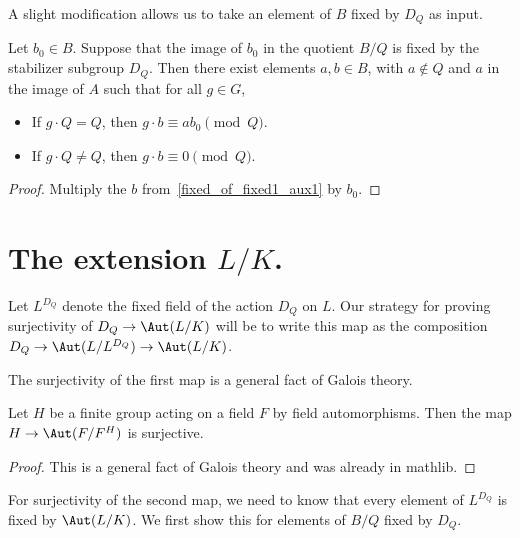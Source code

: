 A slight modification allows us to take an element of $B$ fixed by $D_Q$ as input.

\begin{lemma}
  \label{fixed_of_fixed1_aux2}
  \mathlibok
  Let $b_0 \in B$.
  Suppose that the image of $b_0$ in the quotient $B/Q$ is fixed by the stabilizer subgroup
  $D_Q$.
  Then there exist elements $a,b \in B$, with $a\notin Q$ and $a$ in the image of $A$ such that
  for all $g\in G$,
  \begin{itemize}
    \item If $g \cdot Q = Q$, then $g \cdot b \equiv ab_0 \pmod{Q}$.
    \item If $g \cdot Q \neq Q$, then $g \cdot b \equiv 0 \pmod{Q}$.
  \end{itemize}
\end{lemma}
\begin{proof}
  Multiply the $b$ from~\ref{fixed_of_fixed1_aux1} by $b_0$.
  \mathlibok
\end{proof}

\section{The extension \texorpdfstring{$L/K$}{L/K}.}

Let $L^{D_Q}$ denote the fixed field of the action $D_Q$ on $L$.
Our strategy for proving surjectivity of $D_Q \to \Aut(L/K)$ will be to write this map as the
composition $D_Q \to \Aut(L/L^{D_Q}) \to \Aut(L/K)$.

The surjectivity of the first map is a general fact of Galois theory.

\begin{theorem}
  \label{FixedPoints.toAlgAut_surjective}
  Let $H$ be a finite group acting on a field $F$ by field automorphisms.
  Then the map $H \to \Aut(F/F^H)$ is surjective.
  \mathlibok
\end{theorem}
\begin{proof}
  This is a general fact of Galois theory and was already in mathlib.
  \mathlibok
\end{proof}

For surjectivity of the second map, we need to know that every element of $L^{D_Q}$ is fixed by
$\Aut(L/K)$.
We first show this for elements of $B/Q$ fixed by $D_Q$.

